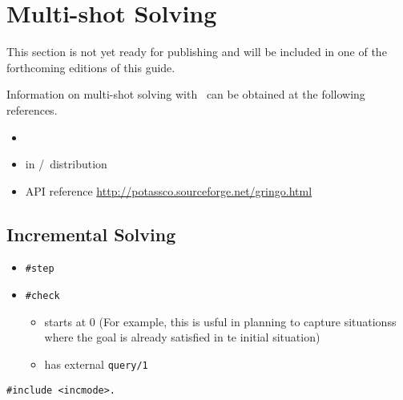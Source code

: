 \section{Multi-shot Solving}\label{sec:multi}

This section is not yet ready for publishing
and will be included in one of the forthcoming editions of this guide.

Information on multi-shot solving with \clingo\ can be obtained at the following references.

\begin{itemize}
\item \cite{gekakasc14b,gekaobsc15a}
\item {} in \gringo/\clingo\ distribution
\item API reference \url{http://potassco.sourceforge.net/gringo.html}
\end{itemize}

\subsection{Incremental Solving}
\label{sec:isolving}

\begin{itemize}
\item \lstinline{#step}
\item \lstinline{#check}
  \begin{itemize}
  \item starts at 0
(For example, this is usful in planning to capture situationss where the goal is already satisfied in te initial situation)
  \item has external \lstinline{query/1}
  \end{itemize}
\end{itemize}





\lstinline{#include <incmode>.}

